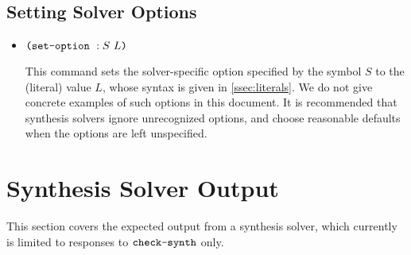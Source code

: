 \documentclass[english,a4paper,10pt]{article}
\begin{document}
\subsection{Setting Solver Options}

\begin{itemize}
\item $\texttt{(}\texttt{set-option}\mbox{ }:S\mbox{ }L\texttt{)}$

This command sets the solver-specific option specified by the symbol $S$ 
to the (literal) value $L$, whose syntax is given in \cref{ssec:literals}.
We do not give concrete examples of such options in this document. %
It is recommended that synthesis solvers
ignore unrecognized options, 
and choose reasonable defaults when the
options are left unspecified.
\end{itemize}

\section{Synthesis Solver Output}%
\label{sec:output}

This section covers the expected output from a synthesis solver,
which currently is limited to responses to $\texttt{check-synth}$ 
only.
\end{document}
